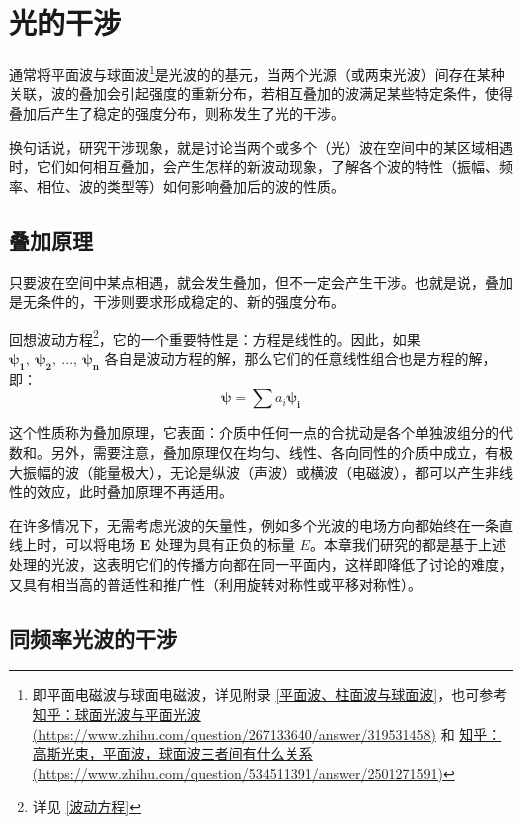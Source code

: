 \documentclass[UTF8]{report}
\theoremstyle{MyLineTheoremStyle} %
\theoremstyle{MyBlockTheoremStyle} %
\theoremstyle{MySubsubsectionStyle} %
\begin{document}
\chapter{光的干涉}\thispagestyle{fancy}


通常将平面波与球面波\footnote{即平面电磁波与球面电磁波，详见附录 \ref{平面波、柱面波与球面波}，也可参考 \href{https://www.zhihu.com/question/267133640/answer/319531458}{知乎：球面光波与平面光波 (https://www.zhihu.com/question/267133640/answer/319531458)} 和 \href{https://www.zhihu.com/question/534511391/answer/2501271591}{知乎：高斯光束，平面波，球面波三者间有什么关系 (https://www.zhihu.com/question/534511391/answer/2501271591)}}是光波的的基元，当两个光源（或两束光波）间存在某种关联，波的叠加会引起强度的重新分布，若相互叠加的波满足某些特定条件，使得叠加后产生了稳定的强度分布，则称发生了光的干涉。

换句话说，研究干涉现象，就是讨论当两个或多个（光）波在空间中的某区域相遇时，它们如何相互叠加，会产生怎样的新波动现象，了解各个波的特性（振幅、频率、相位、波的类型等）如何影响叠加后的波的性质。



\section{叠加原理}
只要波在空间中某点相遇，就会发生叠加，但不一定会产生干涉。也就是说，叠加是无条件的，干涉则要求形成稳定的、新的强度分布。

回想波动方程\footnote{详见 \ref{波动方程}}，它的一个重要特性是：方程是线性的。因此，如果 $\boldsymbol{\psi_1},\ \boldsymbol{\psi_2},\ ...,\ \boldsymbol{\psi_n}$ 各自是波动方程的解，那么它们的任意线性组合也是方程的解，即：
\begin{equation}
\boldsymbol{\psi} = \sum a_i \boldsymbol{\psi_i}
\end{equation}

这个性质称为叠加原理，它表面：介质中任何一点的合扰动是各个单独波组分的代数和。另外，需要注意，叠加原理仅在均匀、线性、各向同性的介质中成立，有极大振幅的波（能量极大），无论是纵波（声波）或横波（电磁波），都可以产生非线性的效应，此时叠加原理不再适用。

在许多情况下，无需考虑光波的矢量性，例如多个光波的电场方向都始终在一条直线上时，可以将电场 $\boldsymbol{E}$ 处理为具有正负的标量 $E$。本章我们研究的都是基于上述处理的光波，这表明它们的传播方向都在同一平面内，这样即降低了讨论的难度，又具有相当高的普适性和推广性（利用旋转对称性或平移对称性）。

\section{同频率光波的干涉}
\end{document}
